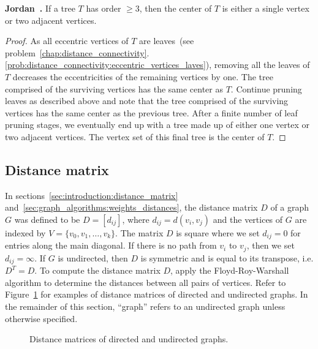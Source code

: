 \begin{theorem}
\textbf{Jordan~\cite{Jordan1869}.}
If a tree $T$ has order $\geq 3$, then the center of $T$ is either a
single vertex or two adjacent vertices.
\end{theorem}

\begin{proof}
As all eccentric vertices of $T$ are leaves~(see
problem~\ref{chap:distance_connectivity}.\ref{prob:distance_connectivity:eccentric_vertices_laves}),
removing all the leaves of $T$ decreases the eccentricities of the
remaining vertices by one. The tree comprised of the surviving
vertices has the same center as $T$. Continue pruning leaves as
described above and note that the tree comprised of the surviving
vertices has the same center as the previous tree. After a finite
number of leaf pruning stages, we eventually end up with a tree made
up of either one vertex or two adjacent vertices. The vertex set of
this final tree is the center of $T$.
\end{proof}



\subsection{Distance matrix}

In sections~\ref{sec:introduction:distance_matrix}
and~\ref{sec:graph_algorithms:weights_distances}, the distance matrix
$D$ of a graph $G$ was defined to be $D = [d_{ij}]$, where
$d_{ij} = d(v_i, v_j)$ and the vertices of $G$ are indexed by
$V = \{v_0, v_1, \dots, v_k\}$. The matrix $D$ is square where we set
$d_{ij} = 0$ for entries along the main diagonal. If there is no path
from $v_i$ to $v_j$, then we set $d_{ij} = \infty$. If $G$ is
undirected, then $D$ is symmetric and is equal to its transpose,
i.e. $D^T = D$. To compute the distance matrix $D$, apply the
Floyd-Roy-Warshall algorithm to
determine the distances between all pairs of vertices. Refer to
Figure~\ref{fig:distance_connectivity:distance_matrix_directed_undirected_graphs}
for examples of distance matrices of directed and undirected
graphs. In the remainder of this section, ``graph'' refers to an
undirected graph unless otherwise specified.

\begin{figure}[!htbp]
\centering
{}

\caption{Distance matrices of directed and undirected graphs.}
\label{fig:distance_connectivity:distance_matrix_directed_undirected_graphs}
\end{figure}

